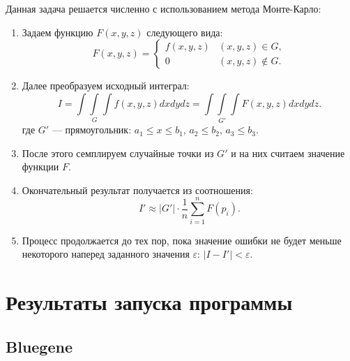 \documentclass[a4paper, 12pt]{article}
\begin{document}
    Данная задача решается численно с использованием метода Монте-Карло: 
    \begin{enumerate}
        \item Задаем функцию $F(x, y, z)$ следующего вида:
            \begin{equation}
                F\left(x, y, z\right) = \left\{
                    \begin{array}{ll}
                        f\left(x, y, z\right) & \left(x, y, z\right) \in G, \\
                        0 & \left(x, y, z\right) \not\in G.
                    \end{array}
                \right.
            \end{equation}
        \item Далее преобразуем исходный интеграл:
            \begin{equation}
                I = \int\int\limits_{G}\int f\left(x, y, z\right)dxdydz = \int\int\limits_{G'}\int F\left(x, y, z\right) dxdydz.
            \end{equation}
            где $G'$ --- прямоугольник: $a_1 \leq x \leq b_1$, $a_2 \leq b_2$, $a_3 \leq b_3$.
        \item После этого семплируем случайные точки из $G'$ и на них считаем значение функции $F$.
        \item Окончательный результат получается из соотношения:
            \begin{equation}
                I' \approx \rvert G' \rvert \cdot \frac{1}{n} \sum\limits_{i = 1}^n F(p_i).
            \end{equation}
        \item Процесс продолжается до тех пор, пока значение ошибки не будет меньше некоторого наперед заданного значения $\varepsilon$: $|I - I'| < \varepsilon$.
    \end{enumerate}

\section{Результаты запуска программы}

\subsection{Bluegene}
\end{document}
